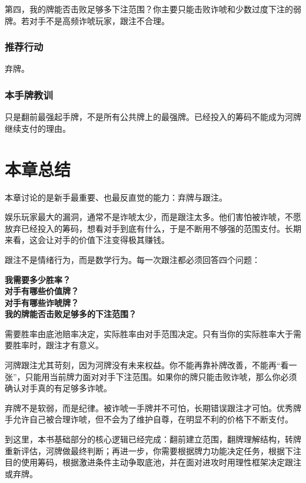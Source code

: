 第四，我的牌能否击败足够多下注范围？你主要只能击败诈唬和少数过度下注的弱牌。若对手不是高频诈唬玩家，跟注不合理。

\subsubsection*{推荐行动}

弃牌。

\subsubsection*{本手牌教训}

 只是翻前最强起手牌，不是所有公共牌上的最强牌。已经投入的筹码不能成为河牌继续支付的理由。

\section{本章总结}

本章讨论的是新手最重要、也最反直觉的能力：弃牌与跟注。

娱乐玩家最大的漏洞，通常不是诈唬太少，而是跟注太多。他们害怕被诈唬，不愿放弃已经投入的筹码，想看对手到底有什么，于是不断用不够强的范围支付。长期来看，这会让对手的价值下注变得极其赚钱。

跟注不是情绪行为，而是数学行为。每一次跟注都必须回答四个问题：

\begin{center}
\textbf{我需要多少胜率？\\
对手有哪些价值牌？\\
对手有哪些诈唬牌？\\
我的牌能否击败足够多的下注范围？}
\end{center}

需要胜率由底池赔率决定，实际胜率由对手范围决定。只有当你的实际胜率大于需要胜率时，跟注才有意义。

河牌跟注尤其苛刻，因为河牌没有未来权益。你不能再靠补牌改善，不能再“看一张”，只能用当前牌力面对对手下注范围。如果你的牌只能击败诈唬，那么你必须确认对手真的有足够多诈唬。

弃牌不是软弱，而是纪律。被诈唬一手牌并不可怕，长期错误跟注才可怕。优秀牌手允许自己被合理诈唬，但不会为了维护自尊，在明显不利的价格下不断支付。

到这里，本书基础部分的核心逻辑已经完成：翻前建立范围，翻牌理解结构，转牌重新评估，河牌做最终判断；再进一步，你需要根据牌力功能决定任务，根据下注目的使用筹码，根据激进条件主动争取底池，并在面对进攻时用理性框架决定跟注或弃牌。

